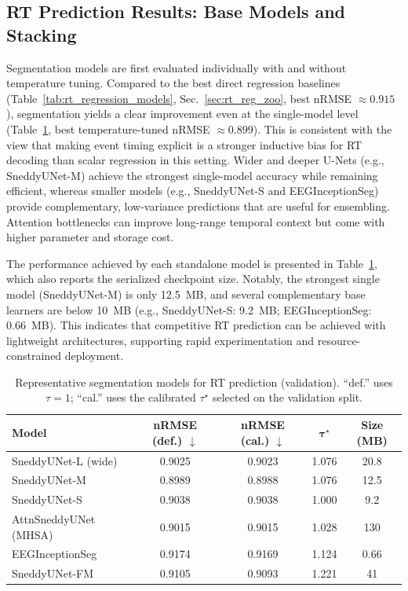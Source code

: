 \documentclass[12pt]{article}
\begin{document}
\subsection{RT Prediction Results: Base Models and Stacking}
\label{sec:rt_results}

Segmentation models are first evaluated individually with and without temperature tuning. Compared to the best direct
regression baselines (Table~\ref{tab:rt_regression_models}, Sec.~\ref{sec:rt_reg_zoo}, best nRMSE $\approx 0.915$), segmentation yields a clear
improvement even at the single-model level (Table~\ref{tab:base_models}, best temperature-tuned nRMSE $\approx 0.899$).
This is consistent with the view that making event timing explicit is a stronger inductive bias for RT decoding than
scalar regression in this setting. Wider and deeper U-Nets (e.g., SneddyUNet-M) achieve the strongest single-model
accuracy while remaining efficient, whereas smaller models (e.g., SneddyUNet-S and EEGInceptionSeg) provide
complementary, low-variance predictions that are useful for ensembling. Attention bottlenecks can improve long-range
temporal context but come with higher parameter and storage cost.

The performance achieved by each standalone model is presented in Table~\ref{tab:base_models}, which also reports the
serialized checkpoint size. Notably, the strongest single model (\mbox{SneddyUNet-M}) is only 12.5~MB, and several
complementary base learners are below 10~MB (e.g., SneddyUNet-S: 9.2~MB; EEGInceptionSeg: 0.66~MB). This indicates that
competitive RT prediction can be achieved with lightweight architectures, supporting rapid experimentation and
resource-constrained deployment.

\begin{table}[!t]
\centering
\caption{Representative segmentation models for RT prediction (validation). ``def.'' uses $\tau=1$; ``cal.'' uses the
calibrated $\tau^\star$ selected on the validation split.}
\label{tab:base_models}
\small
\setlength{\tabcolsep}{6pt}
\renewcommand{\arraystretch}{1.15}
\begin{tabular}{lcccc}
\hline
\textbf{Model} & \textbf{nRMSE (def.)} $\downarrow$ & \textbf{nRMSE (cal.)} $\downarrow$ & $\boldsymbol{\tau^\star}$ & \textbf{Size (MB)} \\
\hline
SneddyUNet-L (wide)     & 0.9025 & 0.9023 & 1.076 & 20.8 \\
SneddyUNet-M            & 0.8989 & 0.8988 & 1.076 & 12.5 \\
SneddyUNet-S            & 0.9038 & 0.9038 & 1.000 & 9.2 \\
AttnSneddyUNet (MHSA)   & 0.9015 & 0.9015 & 1.028 & 130 \\
EEGInceptionSeg         & 0.9174 & 0.9169 & 1.124 & 0.66 \\
SneddyUNet-FM           & 0.9105 & 0.9093 & 1.221 & 41 \\
\hline
\end{tabular}
\end{table}
\end{document}
